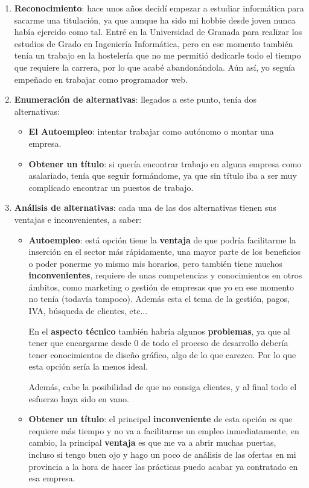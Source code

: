\begin{enumerate}
    \item \textbf{Reconocimiento}: hace unos años decidí empezar a estudiar informática para sacarme una titulación, ya que aunque ha sido mi hobbie desde joven nunca había ejercido como tal. Entré en la Universidad de Granada para realizar los estudios de Grado en Ingeniería Informática, pero en ese momento también tenía un trabajo en la hostelería que no me permitió dedicarle todo el tiempo que requiere la carrera, por lo que acabé abandonándola. Aún así, yo seguía empeñado en trabajar como programador web.

    \item \textbf{Enumeración de alternativas}: llegados a este punto, tenía dos alternativas:
    \begin{itemize}
        \item \textbf{El Autoempleo}: intentar trabajar como autónomo o montar una empresa.
        \item \textbf{Obtener un título}: si quería encontrar trabajo en alguna empresa como asalariado, tenía que seguir formándome, ya que sin título iba a ser muy complicado encontrar un puestos de trabajo.
    \end{itemize}

    \item \textbf{Análisis de alternativas}: cada una de las dos alternativas tienen sus ventajas e inconvenientes, a saber:
    \begin{itemize}
       \item \textbf{Autoempleo}: está opción tiene la \textbf{ventaja} de que podría facilitarme la inserción en el sector más rápidamente, una mayor parte de los beneficios o poder ponerme yo mismo mis horarios, pero también tiene muchos \textbf{inconvenientes}, requiere de unas competencias y conocimientos en otros ámbitos, como marketing o gestión de empresas que yo en ese momento no tenía (todavía tampoco). Además esta el tema de la gestión, pagos, IVA, búsqueda de clientes, etc...

       En el \textbf{aspecto técnico} también habría algunos \textbf{problemas}, ya que al tener que encargarme desde 0 de todo el proceso de desarrollo debería tener conocimientos de diseño gráfico, algo de lo que carezco. Por lo que esta opción sería la menos ideal.

       Además, cabe la posibilidad de que no consiga clientes, y al final todo el esfuerzo haya sido en vano.

       \item \textbf{Obtener un título}: el principal \textbf{inconveniente} de esta opción es que requiere más tiempo y no va a facilitarme un empleo inmediatamente, en cambio, la principal \textbf{ventaja} es que me va a abrir muchas puertas, incluso si tengo buen ojo y hago un poco de análisis de las ofertas en mi provincia a la hora de hacer las prácticas puedo acabar ya contratado en esa empresa.


\end{itemize}
\end{enumerate}
